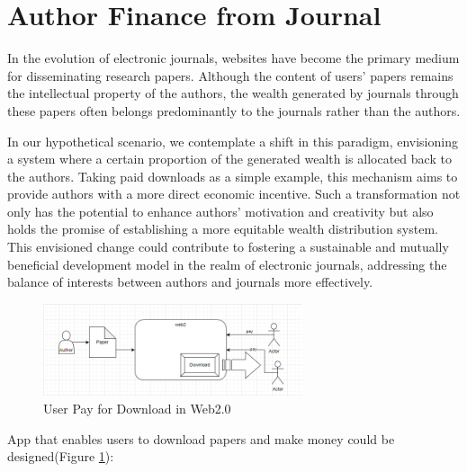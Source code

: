 \documentclass[lettersize,journal]{IEEEtran}
\begin{document}
\section{Author Finance from Journal}


In the evolution of electronic journals, websites have become the primary medium for disseminating research papers. Although the content of users' papers remains the intellectual property of the authors, the wealth generated by journals through these papers often belongs predominantly to the journals rather than the authors.

In our hypothetical scenario, we contemplate a shift in this paradigm, envisioning a system where a certain proportion of the generated wealth is allocated back to the authors. Taking paid downloads as a simple example, this mechanism aims to provide authors with a more direct economic incentive. Such a transformation not only has the potential to enhance authors' motivation and creativity but also holds the promise of establishing a more equitable wealth distribution system. This envisioned change could contribute to fostering a sustainable and mutually beneficial development model in the realm of electronic journals, addressing the balance of interests between authors and journals more effectively.

\begin{figure}[h]
  \includegraphics[width=3in]{assets/web2.png}
  \caption{User Pay for Download in Web2.0}
  \label{fig:web2}
\end{figure}

App that enables users to download papers and make money could be designed(Figure \ref{fig:web2}):
\end{document}
